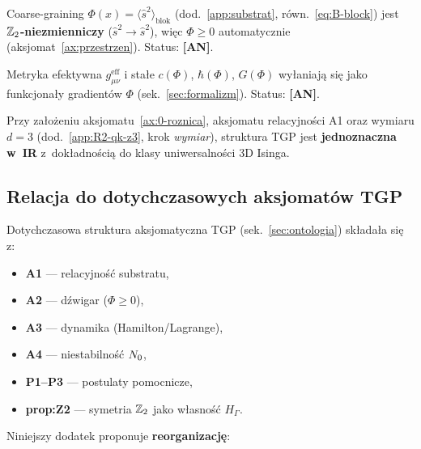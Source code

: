 \begin{chain}%
\label{chain:0-krok4}
Coarse-graining $\Phi(x) = \langle \hat{s}^2 \rangle_{\mathrm{blok}}$
(dod.~\ref{app:substrat}, r\'own.~\ref{eq:B-block}) jest
\textbf{$\mathbb{Z}_2$-niezmienniczy} ($\hat{s}^2 \to \hat{s}^2$), wi\k{e}c
$\Phi \geq 0$ automatycznie (aksjomat~\ref{ax:przestrzen}).
Status: \textbf{[AN]}.
\end{chain}

\begin{chain}%
\label{chain:0-krok5}
Metryka efektywna $g_{\mu\nu}^{\mathrm{eff}}$ i sta\l{}e $c(\Phi)$,
$\hbar(\Phi)$, $G(\Phi)$ wy\l{}aniaj\k{a} si\k{e} jako funkcjona\l{}y
gradient\'ow $\Phi$ (sek.~\ref{sec:formalizm}). Status: \textbf{[AN]}.
\end{chain}

\begin{corollary}\label{cor:0-jednoznacznosc}
Przy za\l{}o\.zeniu aksjomatu~\ref{ax:0-roznica}, aksjomatu
relacyjności A1 oraz wymiaru $d=3$ (dod.~\ref{app:R2-qk-z3}, krok
\emph{wymiar}), struktura TGP jest \textbf{jednoznaczna w~IR}
z~dok\l{}adnością do klasy uniwersalności 3D Isinga.
\end{corollary}

\subsection{Relacja do dotychczasowych aksjomat\'ow TGP}%
\label{app:0-relacja}

Dotychczasowa struktura aksjomatyczna TGP (sek.~\ref{sec:ontologia})
sk\l{}ada\l{}a si\k{e} z:
\begin{itemize}[nosep]
  \item \textbf{A1} --- relacyjno\'s\'c substratu,
  \item \textbf{A2} --- d\'zwigar ($\Phi \geq 0$),
  \item \textbf{A3} --- dynamika (Hamilton/Lagrange),
  \item \textbf{A4} --- niestabilność $N_0$,
  \item \textbf{P1--P3} --- postulaty pomocnicze,
  \item \textbf{prop:Z2} --- symetria $\mathbb{Z}_2$ jako w\l{}asność
    $H_\Gamma$.
\end{itemize}

Niniejszy dodatek proponuje \textbf{reorganizacj\k{e}}:

